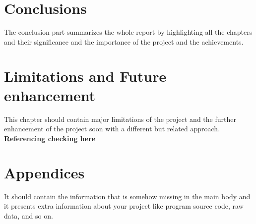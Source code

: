 \documentclass[12pt]{report}
\begin{document}
\chapter{Conclusions}
The conclusion part summarizes the whole report by highlighting all the chapters and their significance and the importance of the project and the achievements.
\chapter{Limitations and Future enhancement}
This chapter should contain major limitations of the project and the further enhancement of the project soon with a different but related approach. \textbf{Referencing checking here}\cite{giri2019transfer}
\renewcommand{\bibname}{References}


\chapter*{Appendices}
It should contain the information that is somehow missing in the main body and it presents extra information about your project like program source code, raw data, and so on.
\end{document}
